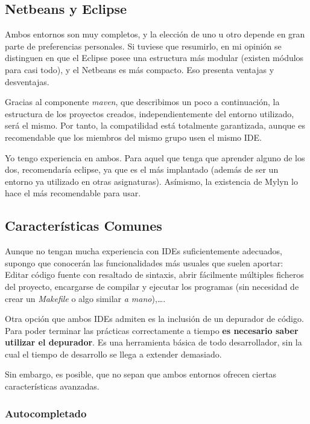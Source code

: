 \documentclass[11pt]{article}
\begin{document}
\subsection{Netbeans y Eclipse}
\label{sec-3-1}




Ambos entornos son muy completos, y la elección de uno u otro depende en gran parte de preferencias
personales. Si tuviese que resumirlo, en mi opinión se distinguen en que el Eclipse posee una estructura 
más modular (existen módulos para casi todo), y el Netbeans es más compacto. Eso presenta ventajas y 
desventajas. 


Gracias al componente \emph{maven}, que describimos un poco a continuación, la estructura de los
proyectos creados, independientemente del entorno utilizado, será el mismo. Por tanto, la
compatilidad está totalmente garantizada, aunque es recomendable que los miembros del mismo grupo
usen el mismo IDE. 


Yo tengo experiencia en ambos. Para aquel que tenga que aprender alguno de los dos, recomendaría
eclipse, ya que es el más implantado (además de ser un entorno ya utilizado en otras asignaturas).
Asímismo, la existencia de Mylyn lo hace el más recomendable para usar. 
\subsection{Características Comunes}
\label{sec-3-2}




Aunque no tengan mucha experiencia con IDEs suficientemente adecuados, supongo que conocerán las
funcionalidades más usuales que suelen aportar: Editar código fuente con resaltado de sintaxis,
abrir fácilmente múltiples ficheros del proyecto, encargarse de compilar y ejecutar los programas
(sin necesidad de crear un \emph{Makefile} o algo similar \emph{a mano}),\ldots{}.


Otra opción que ambos IDEs admiten es la inclusión de un depurador de código. Para poder terminar
las prácticas correctamente a tiempo \textbf{es necesario saber utilizar el depurador}. Es una herramienta
básica de todo desarrollador, sin la cual el tiempo de desarrollo se llega a extender demasiado.


Sin embargo, es posible, que no sepan que ambos entornos ofrecen ciertas características avanzadas.
\subsubsection{Autocompletado}
\label{sec-3-2-1}
\end{document}

